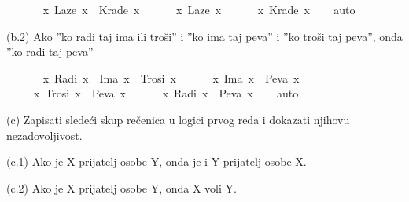 \begin{isabellebody}
\begin{exercise}[subtitle=Zapisivanje logičkih formula]
\ {\isachardoublequoteopen}\isanewline
\ \ \ \ {\isacharparenleft}{\kern0pt}{\isasymforall}\ x{\isachardot}{\kern0pt}\ Laze\ x\ {\isasymlongrightarrow}\ Krade\ x{\isacharparenright}{\kern0pt}\ {\isasymand}\isanewline
\ \ \ \ {\isacharparenleft}{\kern0pt}{\isasymexists}\ x{\isachardot}{\kern0pt}\ Laze\ x{\isacharparenright}{\kern0pt}\ {\isasymlongrightarrow}\isanewline
\ \ \ \ {\isacharparenleft}{\kern0pt}{\isasymexists}\ x{\isachardot}{\kern0pt}\ Krade\ x{\isacharparenright}{\kern0pt}{\isachardoublequoteclose}\isanewline
%
\isadelimproof
\ \ %
\endisadelimproof
%
\isatagproof
{}\isamarkupfalse%
\ auto%
\endisatagproof
{\isafoldproof}%
%
\isadelimproof
%
\endisadelimproof
%
\begin{isamarkuptext}%
(b.2) Ako ”ko radi taj ima ili troši” i ”ko ima taj peva” i ”ko troši taj peva”, onda
”ko radi taj peva”%
\end{isamarkuptext}\isamarkuptrue%
\isamarkupfalse%
\ {\isachardoublequoteopen}\isanewline
\ \ \ \ {\isacharparenleft}{\kern0pt}{\isasymforall}\ x{\isachardot}{\kern0pt}\ Radi\ x\ {\isasymlongrightarrow}\ Ima\ x\ {\isasymand}\ Trosi\ x{\isacharparenright}{\kern0pt}\ {\isasymand}\isanewline
\ \ \ \ {\isacharparenleft}{\kern0pt}{\isasymforall}\ x{\isachardot}{\kern0pt}\ Ima\ x\ {\isasymlongrightarrow}\ Peva\ x{\isacharparenright}{\kern0pt}\ {\isasymand}\isanewline
\ \ \ \ {\isacharparenleft}{\kern0pt}{\isasymforall}\ x{\isachardot}{\kern0pt}\ Trosi\ x\ {\isasymlongrightarrow}\ Peva\ x{\isacharparenright}{\kern0pt}\ {\isasymlongrightarrow}\isanewline
\ \ \ \ {\isacharparenleft}{\kern0pt}{\isasymforall}\ x{\isachardot}{\kern0pt}\ Radi\ x\ {\isasymlongrightarrow}\ Peva\ x{\isacharparenright}{\kern0pt}{\isachardoublequoteclose}\isanewline
%
\isadelimproof
\ \ %
\endisadelimproof
%
\isatagproof
{}\isamarkupfalse%
\ auto%
\endisatagproof
{\isafoldproof}%
%
\isadelimproof
%
\endisadelimproof
%
\begin{isamarkuptext}%
(c) Zapisati sledeći skup rečenica u logici prvog reda i dokazati njihovu 
          nezadovoljivost.%
\end{isamarkuptext}\isamarkuptrue%
%
\begin{isamarkuptext}%
(c.1) Ako je X prijatelj osobe Y, onda je i Y prijatelj osobe X.%
\end{isamarkuptext}\isamarkuptrue%
%
\begin{isamarkuptext}%
(c.2) Ako je X prijatelj osobe Y, onda X voli Y.%
\end{isamarkuptext}\isamarkuptrue%
%
\begin{isamarkuptext}%

\end{isamarkuptext}
\end{exercise}
\end{isabellebody}
